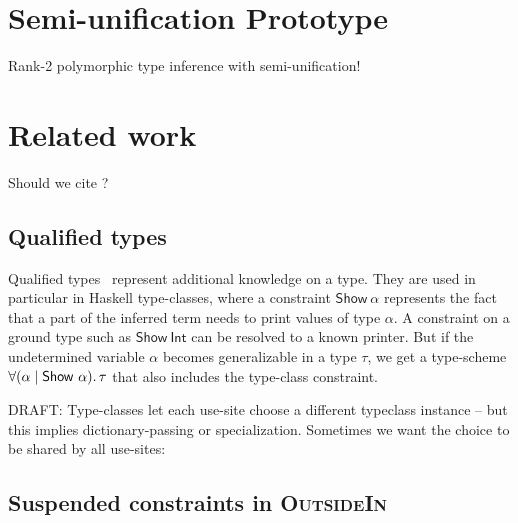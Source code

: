 \documentclass[acmsmall,screen,nonacm]{acmart}
\begin{document}
{


\section{Semi-unification Prototype}

Rank-2 polymorphic type inference with semi-unification!


\section{Related work}
\label{sec:related-work}

Should we cite \cite{Leijen-Ye/prefix@pldi2025} ?

\subsection{Qualified types}


Qualified types~\citep*{TODO} represent additional knowledge on a type. They
are used in particular in Haskell type-classes, where a constraint
$\mathsf{Show}~\alpha$ represents the fact that a part of the inferred term
needs to print values of type $\alpha$. A constraint on a ground type such
as $\mathsf{Show}~\mathsf{Int}$ can be resolved to a known printer. But if
the undetermined variable $\alpha$ becomes generalizable in a type $\tau$,
we get a type-scheme $\forall {(\alpha \mid \mathsf{Show}~\alpha)}.\,{\tau}$ that
also includes the type-class constraint.

DRAFT: Type-classes let each use-site choose a different typeclass instance
-- but this implies dictionary-passing or specialization. Sometimes we want
the choice to be shared by all use-sites:


\subsection{Suspended constraints in \textsc{OutsideIn}}


}
\end{document}
